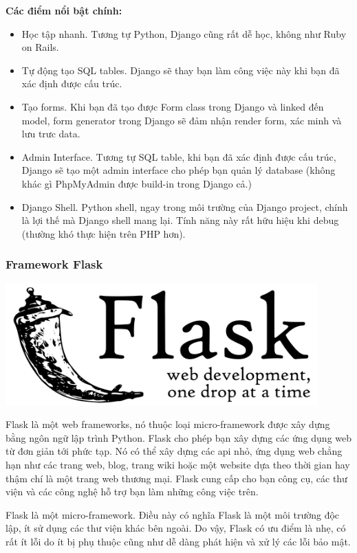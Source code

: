 \textbf{Các điểm nổi bật chính:}
\begin{itemize}
    \item Học tập nhanh. Tương tự Python, Django cũng rất dễ học, không như Ruby on Rails.
    \item Tự động tạo SQL tables. Django sẽ thay bạn làm công việc này khi bạn đã xác định được cấu trúc.
    \item Tạo forms. Khi bạn đã tạo được Form class trong Django và linked đến model, form generator trong Django sẽ đảm nhận render form, xác minh và lưu trưc data.
    \item Admin Interface. Tương tự SQL table, khi bạn đã xác định được cấu trúc, Django sẽ tạo một admin interface cho phép bạn quản lý database (không khác gì PhpMyAdmin được build-in trong Django cả.)
    \item Django Shell. Python shell, ngay trong môi trường của Django project, chính là lợi thế mà Django shell mang lại. Tính năng này rất hữu hiệu khi debug (thường khó thực hiện trên PHP hơn).
\end{itemize}

\subsubsection{Framework Flask}
\begin{center}
  \captionsetup{type=figure}
  \includegraphics[width=12cm]{img/flask.png}
\end{center}

Flask là một web frameworks, nó thuộc loại micro-framework được xây dựng bằng ngôn ngữ lập trình Python. Flask cho phép bạn xây dựng các ứng dụng web từ đơn giản tới phức tạp. Nó có thể xây dựng các api nhỏ, ứng dụng web chẳng hạn như các trang web, blog, trang wiki hoặc một website dựa theo thời gian hay thậm chí là một trang web thương mại. Flask cung cấp cho bạn công cụ, các thư viện và các công nghệ hỗ trợ bạn làm những công việc trên.

Flask là một micro-framework. Điều này có nghĩa Flask là một môi trường độc lập, ít sử dụng các thư viện khác bên ngoài. Do vậy, Flask có ưu điểm là nhẹ, có rất ít lỗi do ít bị phụ thuộc cũng như dễ dàng phát hiện và xử lý các lỗi bảo mật.

